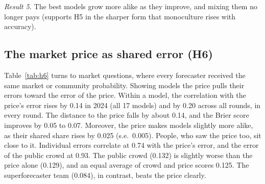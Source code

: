 \documentclass[11pt,a4paper]{article}
\theoremstyle{definition}
\begin{document}
\emph{Result 5.} The best models grow more alike as they improve, and mixing them no longer pays (supports H5 in the sharper form that monoculture rises with accuracy).

\subsection{The market price as shared error (H6)}\label{sec:h6}

Table~\ref{tab:h6} turns to market questions, where every forecaster received the same market or community probability. Showing models the price pulls their errors toward the error of the price. Within a model, the correlation with the price's error rises by 0.14 in 2024 (all 17 models) and by 0.20 across all rounds, in every round. The distance to the price falls by about 0.14, and the Brier score improves by 0.05 to 0.07. Moreover, the price makes models slightly more alike, as their shared share rises by 0.025 (s.e.\ 0.005). People, who saw the price too, sit close to it. Individual errors correlate at 0.74 with the price's error, and the error of the public crowd at 0.93. The public crowd (0.132) is slightly worse than the price alone (0.129), and an equal average of crowd and price scores 0.125. The superforecaster team (0.084), in contrast, beats the price clearly.
\end{document}
